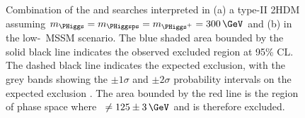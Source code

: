 \begin{figure}[h!]
\begin{center}
\caption[Combination of the \AtoZhtolltautau and \Htohhtobbtautau searches
interpreted in a type-II 2HDM and in the low-\tanb~MSSM scenario.]{Combination of the \AtoZhtolltautau and \Htohhtobbtautau searches
interpreted in (a) a type-II \ac{2HDM} assuming $m_{\PHiggs} = m_{\PHiggsps} = m_{\PHiggs^{+}} = 300\,\GeV$ and 
(b) in the low-\tanb~MSSM scenario. The blue shaded area bounded by
the solid black line indicates the observed excluded region at 95\% \ac{CL}.
The dashed black line indicates the expected exclusion, with the grey bands showing
the $\pm 1\sigma$ and $\pm2\sigma$ probability intervals on the expected exclusion \cite{CMS-HIG-14-034}. The area
bounded by the red line is the region of phase space where \mh~$\neq 125 \pm 3\,\GeV$
 and is therefore excluded.}
\label{fig:HhhAZhMSSM2HDM}
\end{center}
\end{figure}
